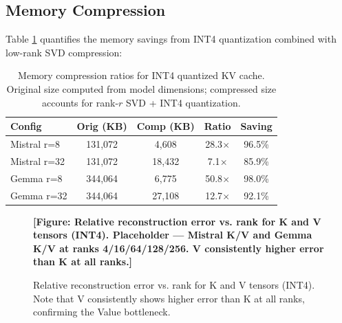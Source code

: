 \documentclass[11pt, a4paper, oneside]{article}
\theoremstyle{myplain}
\theoremstyle{mydefinition}
\theoremstyle{myremark}
\begin{document}
\subsection{Memory Compression}

Table \ref{tab:memory} quantifies the memory savings from INT4 quantization combined with low-rank SVD compression:

\begin{table}[t]
    \centering
    \caption{Memory compression ratios for INT4 quantized KV cache. Original size computed from model dimensions; compressed size accounts for rank-$r$ SVD + INT4 quantization.}
    \begin{tabular}{l|c|c|c|c}
    \toprule
    \textbf{Config} & \textbf{Orig (KB)} & \textbf{Comp (KB)} & \textbf{Ratio} & \textbf{Saving} \\
    \midrule
    Mistral r=8 & 131,072 & 4,608 & 28.3$\times$ & 96.5\% \\
    Mistral r=32 & 131,072 & 18,432 & 7.1$\times$ & 85.9\% \\
    Gemma r=8 & 344,064 & 6,775 & 50.8$\times$ & 98.0\% \\
    Gemma r=32 & 344,064 & 27,108 & 12.7$\times$ & 92.1\% \\
    \bottomrule
    \end{tabular}
    \label{tab:memory}
\end{table}

\begin{figure}[t]
    \centering
    \textbf{[Figure: Relative reconstruction error vs. rank for K and V tensors (INT4). Placeholder — Mistral K/V and Gemma K/V at ranks 4/16/64/128/256. V consistently higher error than K at all ranks.]}
    \caption{Relative reconstruction error vs. rank for K and V tensors (INT4). Note that V consistently shows higher error than K at all ranks, confirming the Value bottleneck.}
    \label{fig:error_rank}
\end{figure}
\end{document}
